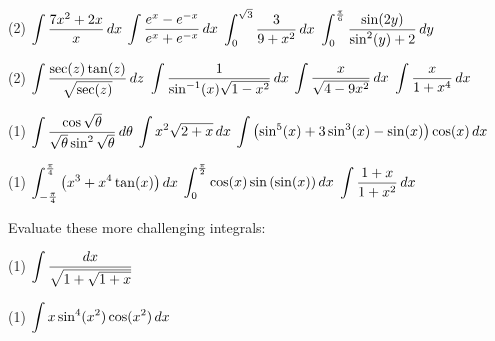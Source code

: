 \documentclass[../mathNotesPreamble]{subfiles}
\begin{document}
  \begin{tasks}[after-item-skip=\stretch{1}, resume](2)
    \task $\ds\int \frac{7x^2+2x}{x}\,dx$
    \task $\ds\int \frac{e^x-e\inv[x]}{e^x+e\inv[x]}\,dx$
    \task $\ds\int_0^{\sqrt{3}} \frac{3}{9+x^2}\,dx$
    \task $\ds\int_0^{\frac{\pi}{6}} \frac{\sin(2y)}{\sin^2(y)+2}\,dy$
  \end{tasks}
  \pagebreak
  
  \begin{tasks}[after-item-skip=\stretch{1}, resume](2)
    \task $\ds\int \frac{\sec(z)\tan(z)}{\sqrt{\sec(z)}}\,dz$
    \task $\ds\int \frac{1}{\sin\inv(x)\sqrt{1-x^2}}\,dx$
    \task $\ds\int \frac{x}{\sqrt{4-9x^2}}\,dx$
    \task $\ds\int \frac{x}{1+x^4}\,dx$
  \end{tasks}
  \pagebreak
  
  \begin{tasks}[after-item-skip=\stretch{1}, resume](1)
    \task $\ds\int \frac{\cos\sqrt{\theta}}{\sqrt{\theta}\sin^2\sqrt{\theta}}\,d\theta$
    \task $\ds\int x^2\sqrt{2+x}\,dx$
    \task* $\ds\int \parens{\sin^5(x)+3\sin^3(x)-\sin(x)}\cos(x)\,dx$
  \end{tasks}
  \pagebreak
  
  \begin{tasks}[after-item-skip=\stretch{1}, resume](1)
    \task $\ds\int_{-\frac{\pi}{4}}^{\frac{\pi}{4}} \parens{x^3+x^4\tan(x)}\,dx$
    \task $\ds\int_{0}^{\frac{\pi}{2}} \cos(x)\sin\parens{\sin(x)}\,dx$
    \task $\ds\int \frac{1+x}{1+x^2}\,dx$
  \end{tasks}
  \pagebreak

  \noindent
  \begin{ex*}
    Evaluate these more challenging integrals:
  \end{ex*}
  \begin{tasks}[after-item-skip=\stretch{1}](1)
    \task $\ds\int \frac{dx}{\sqrt{1+\sqrt{1+x}}}$
  \end{tasks}
  \pagebreak  
  
  \begin{tasks}[after-item-skip=\stretch{1}, resume](1)
    \task $\ds\int x\sin^4(x^2)\cos(x^2)\,dx$
  \end{tasks}
  \pagebreak  
\end{document}
